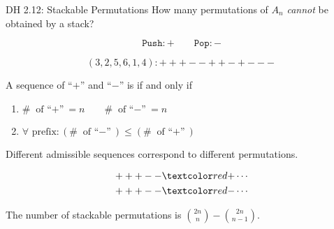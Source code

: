 \begin{frame}{}
  \begin{exampleblock}{DH 2.12: Stackable Permutations}
    How many permutations of $A_n$ \emph{cannot} be obtained by a stack?
  \end{exampleblock}

  \pause

  \[
    \texttt{Push}: + \qquad \texttt{Pop}: -
  \]

  \[
    (3, 2, 5, 6, 1, 4): +++--++-+---
  \]
\end{frame}

\begin{frame}{}
  \begin{definition}
    A sequence of ``$+$'' and ``$-$'' is  if and only if
    \pause
    \begin{enumerate}
      \item $\# \text{ of ``$+$''} = n \qquad \# \text{ of ``$-$''} = n$
      \item $\forall \text{ prefix}: (\# \text{ of ``$-$''}) \le (\# \text{ of ``$+$''})$
    \end{enumerate}
  \end{definition}

  \vspace{0.50cm}
  \pause
  \begin{theorem}
    Different admissible sequences correspond to different permutations.
  \end{theorem}

  \pause
  \begin{align*}
    +++--\red{+} \cdots \\
    +++--\red{-} \cdots \\
  \end{align*}
\end{frame}

\begin{frame}{}
  \begin{theorem}
    The number of stackable permutations is ${2n \choose n} - {2n \choose n-1}$.
  \end{theorem}
\end{frame}

\begin{frame}{}
\end{frame}

\begin{frame}{}
\end{frame}
